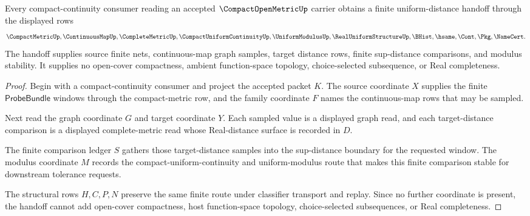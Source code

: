 \begin{theorem}
\label{thm:compact-open-metric-uniform-distance-handoff}
Every compact-continuity consumer reading an accepted $\CompactOpenMetricUp$ carrier obtains a finite uniform-distance handoff through the displayed rows
$$
\CompactMetricUp,\ContinuousMapUp,\CompleteMetricUp,\CompactUniformContinuityUp,\UniformModulusUp,\RealUniformStructureUp,\BHist,\hsame,\Cont,\Pkg,\NameCert .
$$
The handoff supplies source finite nets, continuous-map graph samples, target distance rows, finite sup-distance comparisons, and modulus stability. It supplies no open-cover compactness, ambient function-space topology, choice-selected subsequence, or Real completeness.
\end{theorem}
\begin{proof}
Begin with a compact-continuity consumer and project the accepted packet $K$. The source coordinate $X$ supplies the finite $\mathsf{ProbeBundle}$ windows through the compact-metric row, and the family coordinate $F$ names the continuous-map rows that may be sampled.

Next read the graph coordinate $G$ and target coordinate $Y$. Each sampled value is a displayed graph read, and each target-distance comparison is a displayed complete-metric read whose Real-distance surface is recorded in $D$.

The finite comparison ledger $S$ gathers those target-distance samples into the sup-distance boundary for the requested window. The modulus coordinate $M$ records the compact-uniform-continuity and uniform-modulus route that makes this finite comparison stable for downstream tolerance requests.

The structural rows $H,C,P,N$ preserve the same finite route under classifier transport and replay. Since no further coordinate is present, the handoff cannot add open-cover compactness, host function-space topology, choice-selected subsequences, or Real completeness.
\end{proof}

